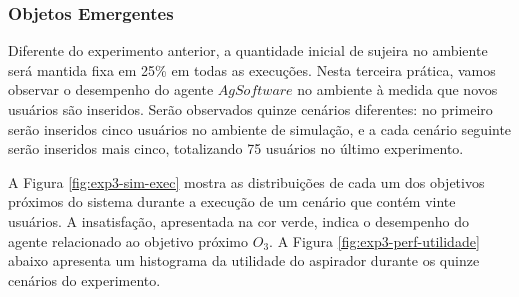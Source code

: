 \subsubsection{Objetos Emergentes}

Diferente do experimento anterior, a quantidade inicial de sujeira no ambiente será mantida fixa em 25\% em todas as execuções. Nesta terceira prática, vamos observar o desempenho do agente $AgSoftware$ no ambiente à medida que novos usuários são inseridos. Serão observados quinze cenários diferentes: no primeiro serão inseridos cinco usuários no ambiente de simulação, e a  cada cenário seguinte serão inseridos mais cinco, totalizando 75 usuários no último experimento.

\begin{figure}[h!]
    \centering
\end{figure}

A Figura \ref{fig:exp3-sim-exec} mostra as distribuições de cada um dos objetivos próximos do sistema durante a execução de um cenário que contém vinte usuários. A insatisfação, apresentada na cor verde, indica o desempenho do agente relacionado ao objetivo próximo $O_3$.  A Figura \ref{fig:exp3-perf-utilidade} abaixo apresenta um histograma da utilidade do aspirador durante os quinze cenários do experimento. 

\clearpage
\begin{figure}[h!]
    \centering
\end{figure}

